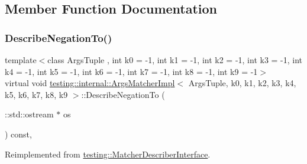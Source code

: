 \subsection{Member Function Documentation}
\mbox{\label{classtesting_1_1internal_1_1_args_matcher_impl_ac8ff5369879836567cedb5434bcca5b9}} 
\subsubsection{\texorpdfstring{Describe\+Negation\+To()}{DescribeNegationTo()}}
{\footnotesize\ttfamily template$<$class Args\+Tuple , int k0 = -\/1, int k1 = -\/1, int k2 = -\/1, int k3 = -\/1, int k4 = -\/1, int k5 = -\/1, int k6 = -\/1, int k7 = -\/1, int k8 = -\/1, int k9 = -\/1$>$ \\
virtual void \hyperlink{classtesting_1_1internal_1_1_args_matcher_impl}{testing\+::internal\+::\+Args\+Matcher\+Impl}$<$ Args\+Tuple, k0, k1, k2, k3, k4, k5, k6, k7, k8, k9 $>$\+::Describe\+Negation\+To (\begin{DoxyParamCaption}\item[{\+::std\+::ostream $\ast$}]{os }\end{DoxyParamCaption}) const\hspace{0.3cm}{\ttfamily [inline]}, {\ttfamily [virtual]}}



Reimplemented from \hyperlink{classtesting_1_1_matcher_describer_interface_a2071afbc47097c4d1c0064275af34db0}{testing\+::\+Matcher\+Describer\+Interface}.

\mbox{\label{classtesting_1_1internal_1_1_args_matcher_impl_a8e057f67b368f7d94aeb0ddd35837c94}} 
